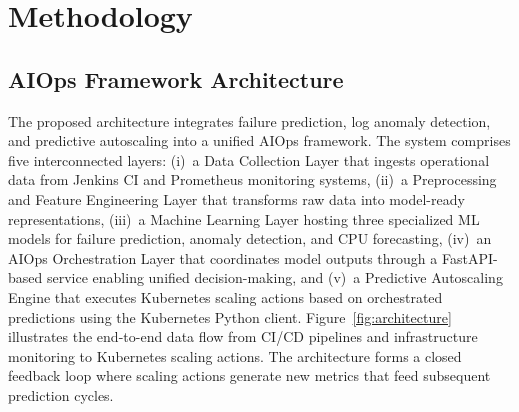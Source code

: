 \documentclass[a4paper,fleqn]{cas-dc}
\begin{document}
\section{Methodology}\label{sec:framework}

\subsection{AIOps Framework Architecture}\label{subsec:overview}

The proposed architecture integrates failure prediction, log anomaly detection, and predictive autoscaling into a unified AIOps framework.
The system comprises five interconnected layers: (i)~a Data Collection Layer that ingests operational data from Jenkins CI and Prometheus monitoring systems, (ii)~a Preprocessing and Feature Engineering Layer that transforms raw data into model-ready representations, (iii)~a Machine Learning Layer hosting three specialized ML models for failure prediction, anomaly detection, and CPU forecasting, (iv)~an AIOps Orchestration Layer that coordinates model outputs through a FastAPI-based service enabling unified decision-making, and (v)~a Predictive Autoscaling Engine that executes Kubernetes scaling actions based on orchestrated predictions using the Kubernetes Python client.
Figure~\ref{fig:architecture} illustrates the end-to-end data flow from CI/CD pipelines and infrastructure monitoring to Kubernetes scaling actions.
The architecture forms a closed feedback loop where scaling actions generate new metrics that feed subsequent prediction cycles.
\end{document}
